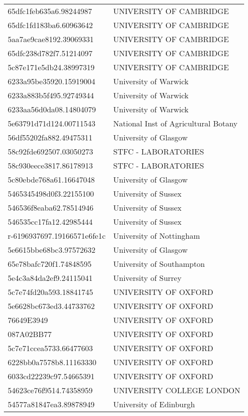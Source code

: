 \begin{tabular}{ll}
65dfc1feb635a6.98244987 & UNIVERSITY OF CAMBRIDGE \\
65dfc1fd183ba6.60963642 & UNIVERSITY OF CAMBRIDGE \\
5aa7ae9cae8192.39069331 & UNIVERSITY OF CAMBRIDGE \\
65dfc238d782f7.51214097 & UNIVERSITY OF CAMBRIDGE \\
5c87e171e5db24.38997319 & UNIVERSITY OF CAMBRIDGE \\
6233a95be35920.15919004 & University of Warwick \\
6233a883b5f495.92749344 & University of Warwick \\
6233aa56d0da08.14804079 & University of Warwick \\
5e63791d71d124.00711543 & National Inst of Agricultural Botany \\
56df55202fa882.49475311 & University of Glasgow \\
58c92fde692507.03050273 & STFC - LABORATORIES \\
58c930eece3817.86178913 & STFC - LABORATORIES \\
5c80ebde768a61.16647048 & University of Glasgow \\
5465345498d0f3.22155100 & University of Sussex \\
546536f8eaba62.78514946 & University of Sussex \\
546535cc17fa12.42985444 & University of Sussex \\
r-6196937697.19166571e6fe1c & University of Nottingham \\
5e6615bbe68bc3.97572632 & University of Glasgow \\
65e78bafc720f1.74848595 & University of Southampton \\
5e4c3a84da2ef9.24115041 & University of Surrey \\
5c7e74fd20a593.18841745 & UNIVERSITY OF OXFORD \\
5e6628bc673ed3.44733762 & UNIVERSITY OF OXFORD \\
76649E3949 & UNIVERSITY OF OXFORD \\
087A02BB77 & UNIVERSITY OF OXFORD \\
5c7e71ccea5733.66477603 & UNIVERSITY OF OXFORD \\
6228bb0a7578b8.11163330 & UNIVERSITY OF OXFORD \\
6033cd22239c97.54665391 & UNIVERSITY OF OXFORD \\
54623ce76f9514.74358959 & UNIVERSITY COLLEGE LONDON \\
54577a81847ea3.89878949 & University of Edinburgh \\

\end{tabular}

